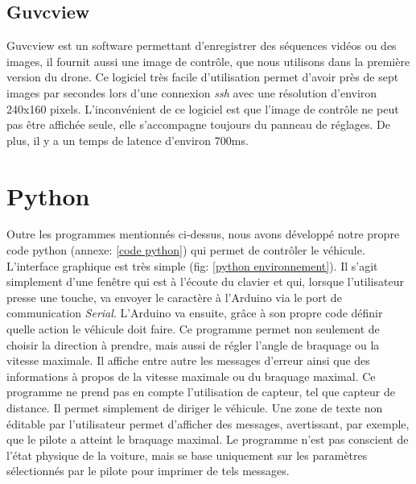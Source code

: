 \documentclass[a4paper,11pt]{report}
\begin{document}
{\subsection{Guvcview}

Guvcview\label{Guvcview} est un software permettant d'enregistrer des séquences vidéos ou des images, il fournit aussi une image de contrôle, que nous utilisons dans la première version du drone. Ce logiciel très facile d'utilisation permet d'avoir près de sept images par secondes lors d'une connexion \textit{ssh} avec une résolution d'environ 240x160 pixels. L'inconvénient de ce logiciel est que l'image de contrôle ne peut pas être affichée seule, elle s'accompagne toujours du panneau de réglages. De plus, il y a un temps de latence d'environ 700ms. 

\section{Python}
Outre les programmes mentionnés ci-dessus, nous avons développé notre propre
code python (annexe: \ref{code python}) qui permet de contrôler le
véhicule. L'interface graphique est très simple
(fig: \ref{python environnement}). Il s'agit simplement d'une fenêtre qui est à
l'écoute du clavier et qui, lorsque l'utilisateur presse une touche, va
envoyer le caractère à l'Arduino via le port de communication
\textit{Serial}. L'Arduino va ensuite, grâce à son propre code définir quelle action le
véhicule doit faire. Ce programme permet non seulement de choisir la direction
à prendre, mais aussi de régler l'angle de braquage ou la vitesse maximale. Il
affiche entre autre les messages d'erreur ainsi que des informations à propos
de la vitesse maximale ou du braquage maximal. Ce programme ne prend pas en
compte l'utilisation de capteur, tel que capteur de distance. Il permet
simplement de diriger le véhicule. Une zone de texte non éditable par
l'utilisateur permet d'afficher des messages, avertissant, par exemple, que le
pilote a atteint le braquage maximal. Le programme n'est pas conscient de
l'état physique de la voiture, mais se base uniquement sur les paramètres
sélectionnés par le pilote pour imprimer de tels messages. 

}
\end{document}
